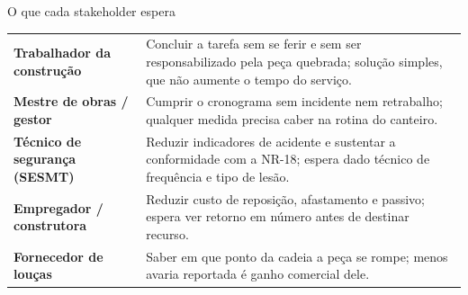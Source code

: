 \documentclass[aspectratio=169,11pt]{beamer}
\begin{document}
\begin{frame}{O que cada stakeholder espera}
  \vspace{0.6em}\footnotesize
  \renewcommand{\arraystretch}{1.5}
  \begin{tabularx}{\textwidth}{@{}p{4.3cm}X@{}}
    \toprule
    \textbf{\color{unbazul}Trabalhador da construção} &
    Concluir a tarefa sem se ferir e sem ser responsabilizado pela peça quebrada;
    solução simples, que não aumente o tempo do serviço.\\
    \textbf{\color{unbazul}Mestre de obras / gestor} &
    Cumprir o cronograma sem incidente nem retrabalho; qualquer medida precisa
    caber na rotina do canteiro.\\
    \textbf{\color{unbazul}Técnico de segurança (SESMT)} &
    Reduzir indicadores de acidente e sustentar a conformidade com a NR-18;
    espera dado técnico de frequência e tipo de lesão.\\
    \textbf{\color{unbazul}Empregador / construtora} &
    Reduzir custo de reposição, afastamento e passivo; espera ver retorno em
    número antes de destinar recurso.\\
    \textbf{\color{unbazul}Fornecedor de louças} &
    Saber em que ponto da cadeia a peça se rompe; menos avaria reportada é ganho
    comercial dele.\\
    \bottomrule
  \end{tabularx}
\end{frame}
\end{document}
